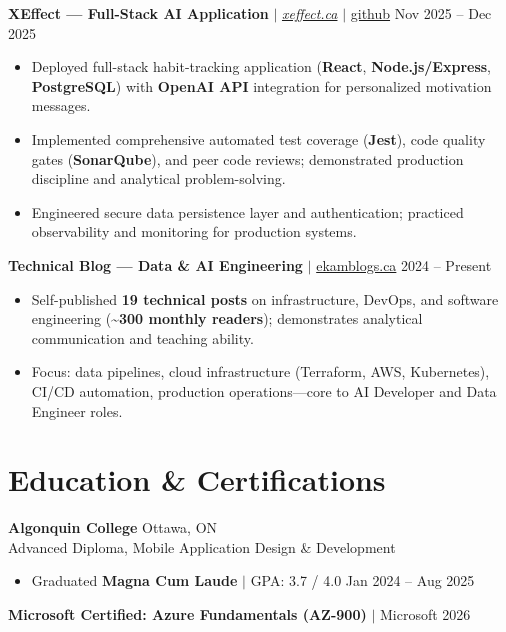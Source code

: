 \documentclass[11pt,a4paper]{article}
\begin{document}
\vspace{4pt}

\textbf{XEffect — Full-Stack AI Application} $|$ \href{https://www.xeffect.ca/app}{\emph{xeffect.ca}} $|$ \href{https://github.com/bhat0155/xeffect}{\small github} \hfill Nov 2025 -- Dec 2025
\begin{itemize}
    \item Deployed full-stack habit-tracking application (\textbf{React}, \textbf{Node.js/Express}, \textbf{PostgreSQL}) with \textbf{OpenAI API} integration for personalized motivation messages.
    \item Implemented comprehensive automated test coverage (\textbf{Jest}), code quality gates (\textbf{SonarQube}), and peer code reviews; demonstrated production discipline and analytical problem-solving.
    \item Engineered secure data persistence layer and authentication; practiced observability and monitoring for production systems.
\end{itemize}

\vspace{4pt}

\textbf{Technical Blog — Data \& AI Engineering} $|$ \href{https://www.ekamblogs.ca}{ekamblogs.ca} \hfill 2024 -- Present
\begin{itemize}
    \item Self-published \textbf{19 technical posts} on infrastructure, DevOps, and software engineering (\textasciitilde\textbf{300 monthly readers}); demonstrates analytical communication and teaching ability.
    \item Focus: data pipelines, cloud infrastructure (Terraform, AWS, Kubernetes), CI/CD automation, production operations—core to AI Developer and Data Engineer roles.
\end{itemize}

\section{Education \& Certifications}

\textbf{Algonquin College} \hfill Ottawa, ON \\
Advanced Diploma, Mobile Application Design \& Development
\begin{itemize}
    \item Graduated \textbf{Magna Cum Laude} $|$ GPA: 3.7 / 4.0 \hfill Jan 2024 -- Aug 2025
\end{itemize}
\textbf{Microsoft Certified: Azure Fundamentals (AZ-900)} $|$ Microsoft \hfill 2026
\end{document}
